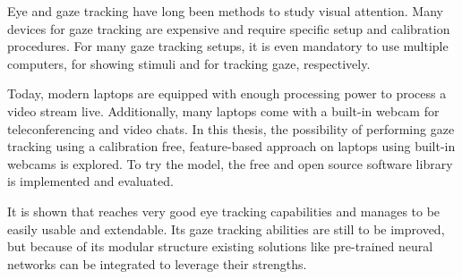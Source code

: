 Eye and gaze tracking have long been methods to study visual attention. Many
devices for gaze tracking are expensive and require specific setup and
calibration procedures. For many gaze tracking setups, it is even mandatory to
use multiple computers, for showing stimuli and for tracking gaze,
respectively.

Today, modern laptops are equipped with enough processing power to process a
video stream live. Additionally, many laptops come with a built-in webcam for
teleconferencing and video chats. In this thesis, the possibility of
performing gaze tracking using a calibration free, feature-based approach on
laptops using built-in webcams is explored. To try the model, the free and
open source software library \Gaze{} is implemented and evaluated.

It is shown that \Gaze{} reaches very good eye tracking capabilities and
manages to be easily usable and extendable. Its gaze tracking abilities are
still to be improved, but because of its modular structure existing solutions
like pre-trained neural networks can be integrated to leverage their strengths.
